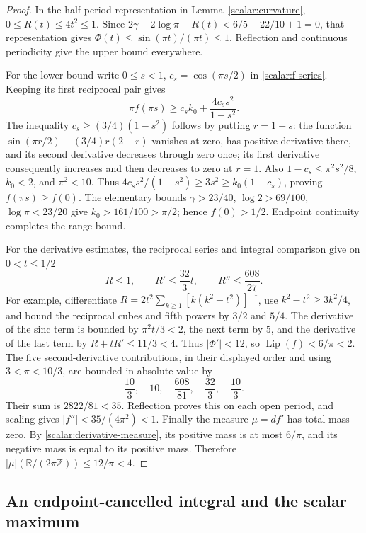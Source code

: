 \begin{proof}
In the half-period representation in Lemma~\ref{scalar:curvature},
$0\leq R(t)\leq4t^2\leq1$.  Since
$2\gamma-2\log\pi+R(t)<6/5-22/10+1=0$, that representation gives
$\Phi(t)\leq\sin(\pi t)/(\pi t)\leq1$.  Reflection and continuous
periodicity give the upper bound everywhere.

For the lower bound write $0\leq s<1$, $c_s=\cos(\pi s/2)$ in
\eqref{scalar:f-series}.  Keeping its first reciprocal pair gives
\[
 \pi f(\pi s)\geq c_sk_0+\frac{4c_ss^2}{1-s^2}.
\]
The inequality $c_s\geq(3/4)(1-s^2)$ follows by putting $r=1-s$:
the function $\sin(\pi r/2)-(3/4)r(2-r)$ vanishes at zero,
has positive derivative there, and its second derivative decreases
through zero once; its first derivative consequently increases and
then decreases to zero at $r=1$.  Also
$1-c_s\leq\pi^2s^2/8$, $k_0<2$, and $\pi^2<10$.  Thus
$4c_ss^2/(1-s^2)\geq3s^2\geq k_0(1-c_s)$, proving
$f(\pi s)\geq f(0)$.  The elementary bounds
$\gamma>23/40$, $\log2>69/100$, $\log\pi<23/20$ give
$k_0>161/100>\pi/2$; hence $f(0)>1/2$.  Endpoint continuity completes
the range bound.

For the derivative estimates, the reciprocal series and integral
comparison give on $0<t\leq1/2$
\[
 R\leq1,\qquad R'\leq\frac{32}{3}t,\qquad
 R''\leq\frac{608}{27}.
\]
For example, differentiate
$R=2t^2\sum_{k\geq1}[k(k^2-t^2)]^{-1}$, use
$k^2-t^2\geq3k^2/4$, and bound the reciprocal cubes and fifth powers
by $3/2$ and $5/4$.  The derivative of the sinc term is bounded by
$\pi^2t/3<2$, the next term by $5$, and the derivative of the last
term by $R+tR'\leq11/3<4$.  Thus $|\Phi'|<12$, so
$\operatorname{Lip}(f)<6/\pi<2$.  The five second-derivative
contributions, in their displayed order and using $3<\pi<10/3$,
are bounded in absolute value by
\[
 \frac{10}{3},\quad10,\quad\frac{608}{81},\quad
 \frac{32}{3},\quad\frac{10}{3}.
\]
Their sum is $2822/81<35$.  Reflection proves this on each open
period, and scaling gives $|f''|<35/(4\pi^2)<1$.
Finally the measure $\mu=df'$ has total mass zero.  By
\eqref{scalar:derivative-measure}, its positive mass is at most
$6/\pi$, and its negative mass is equal to its positive mass.
Therefore $|\mu|(\mathbb R/(2\pi\mathbb Z))\leq12/\pi<4$.
\end{proof}

\subsection{An endpoint-cancelled integral and the scalar maximum}

